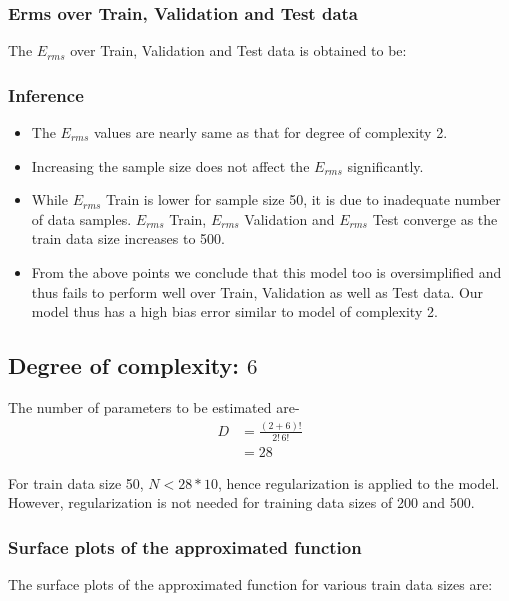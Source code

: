 \documentclass[12pt,a4paper]{article}
\newcommand{\noi}{\noindent}
\begin{document}
\subsubsection{Erms over Train, Validation and Test data}
The $E_{rms}$ over Train, Validation and Test data is obtained to be:


\subsubsection{Inference}
\begin{itemize}
    \itemsep0em
    \item The $E_{rms}$ values are nearly same as that for degree of complexity 2.
    \item Increasing the sample size does not affect the $E_{rms}$ significantly.
    \item While $E_{rms}$ Train is lower for sample size 50, it is due to inadequate number of data samples. $E_{rms}$ Train, $E_{rms}$ Validation and $E_{rms}$ Test converge as the train data size increases to 500.
    \item From the above points we conclude that this model too is oversimplified and thus fails to perform well over Train, Validation as well as Test data. Our model thus has a high bias error similar to model of complexity 2. 
\end{itemize}

\subsection{Degree of complexity: $6$}
The number of parameters to be estimated are-
\begin{equation}
    \begin{split}
        D&=\frac{(2+6)!}{2!\,6!} \\
        &=28
    \end{split}
\end{equation}

\noi
For train data size 50, $N<28*10$, hence regularization is applied to the model. However, regularization is not needed for training data sizes of 200 and 500. 

\subsubsection{Surface plots of the approximated function}
The surface plots of the approximated function for various train data sizes are:
\end{document}
